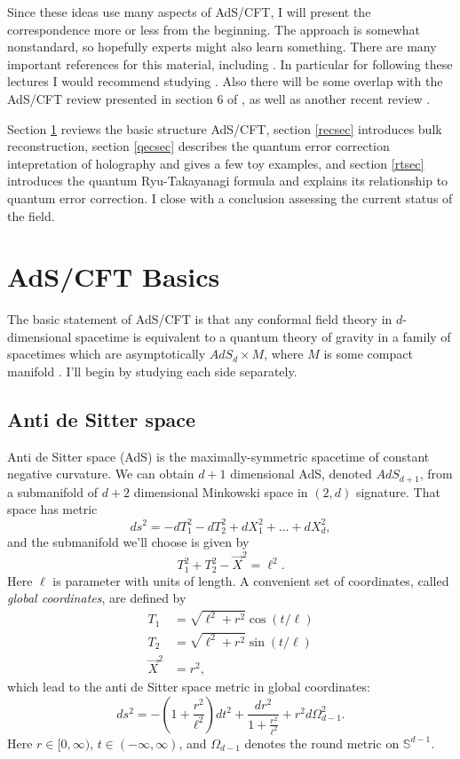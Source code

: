 \documentclass[toc]{PoS}
\newcommand{\be}{\begin{equation}}
\newcommand{\ee}{\end{equation}}
\begin{document}
Since these ideas use many aspects of AdS/CFT, I will present the correspondence more or less from the beginning.  The approach is somewhat nonstandard, so hopefully experts might also learn something. There are many important references for this material, including \cite{Banks:1998dd,Hamilton:2006az,Heemskerk:2009pn,Heemskerk:2012mn,Heemskerk:2012np,Wall:2012uf,Papadodimas:2012aq,Faulkner:2013ana,Headrick:2014cta,Almheiri:2014lwa,Pastawski:2015qua,Jafferis:2015del,Hayden:2016cfa,Dong:2016eik,Harlow:2016vwg,Cotler:2017erl}.  In particular for following these lectures I would recommend studying \cite{Banks:1998dd,Hamilton:2006az,Heemskerk:2009pn,Heemskerk:2012mn,Almheiri:2014lwa,Harlow:2016vwg}.  Also there will be some overlap with the AdS/CFT review presented in section 6 of \cite{Harlow:2014yka}, as well as another recent review \cite{DeJonckheere:2017qkk}.  

Section \ref{adssec} reviews the basic structure AdS/CFT, section \ref{recsec} introduces bulk reconstruction, section \ref{qecsec} describes the quantum error correction intepretation of holography and gives a few toy examples, and section \ref{rtsec} introduces the quantum Ryu-Takayanagi formula and explains its relationship to quantum error correction. I close with a conclusion assessing the current status of the field.

\section{AdS/CFT Basics}\label{adssec}
The basic statement of AdS/CFT is that any conformal field theory in $d$-dimensional spacetime is equivalent to a quantum theory of gravity in a family of spacetimes which are asymptotically $AdS_d \times M$, where $M$ is some compact manifold \cite{Maldacena:1997re,Gubser:1998bc,Witten:1998qj}.  I'll begin by studying each side separately.

\subsection{Anti de Sitter space}
Anti de Sitter space (AdS) is the maximally-symmetric spacetime of constant negative curvature.  We can obtain $d+1$ dimensional AdS, denoted $AdS_{d+1}$, from a submanifold of $d+2$ dimensional Minkowski space in $(2,d)$ signature.  That space has metric
\be
ds^2=-dT_1^2-dT_2^2+dX_1^2+\ldots +dX_{d}^2,
\ee
and the submanifold we'll choose is given by
\be\label{embedding}
T_1^2+T_2^2-\vec{X}^2=\ell^2.
\ee
Here $\ell$ is parameter with units of length.  A convenient set of coordinates, called \textit{global coordinates}, are defined by
\begin{align}\nonumber
T_1&= \sqrt{\ell^2+r^2}\cos (t/\ell)\\\label{globalcoord}
T_2&= \sqrt{\ell^2+r^2}\sin (t/\ell)\\\nonumber
\vec{X}^2&=r^2,
\end{align}
which lead to the anti de Sitter space metric in global coordinates:
\be\label{adsmetric}
ds^2=-\left(1+\frac{r^2}{\ell^2}\right)dt^2+\frac{dr^2}{1+\frac{r^2}{\ell^2}}+r^2 d\Omega_{d-1}^2.
\ee
Here $r\in[0,\infty)$, $t\in (-\infty,\infty)$, and $\Omega_{d-1}$ denotes the round metric on $\mathbb{S}^{d-1}$.  
\end{document}
